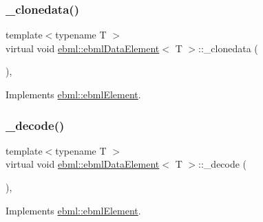 \subsubsection{\texorpdfstring{\+\_\+clonedata()}{\_clonedata()}}
{\footnotesize\ttfamily template$<$typename T $>$ \\
virtual void \mbox{\hyperlink{classebml_1_1ebmlDataElement}{ebml\+::ebml\+Data\+Element}}$<$ T $>$\+::\+\_\+clonedata (\begin{DoxyParamCaption}\item[{const \mbox{\hyperlink{classebml_1_1ebmlElement}{ebml\+Element}} $\ast$}]{ }\end{DoxyParamCaption})\hspace{0.3cm}{\ttfamily [protected]}, {\ttfamily [virtual]}}



Implements \mbox{\hyperlink{classebml_1_1ebmlElement_a3ebe3aa75b62971f385c01f27c807a02}{ebml\+::ebml\+Element}}.

\mbox{\label{classebml_1_1ebmlDataElement_a8a3c04faedabb3667e6750fd2d563c59}} 
\subsubsection{\texorpdfstring{\+\_\+decode()}{\_decode()}\hspace{0.1cm}{\footnotesize\ttfamily [1/2]}}
{\footnotesize\ttfamily template$<$typename T $>$ \\
virtual void \mbox{\hyperlink{classebml_1_1ebmlDataElement}{ebml\+::ebml\+Data\+Element}}$<$ T $>$\+::\+\_\+decode (\begin{DoxyParamCaption}\item[{const \mbox{\hyperlink{classebml_1_1parseString}{parse\+String}} \&}]{ }\end{DoxyParamCaption})\hspace{0.3cm}{\ttfamily [protected]}, {\ttfamily [virtual]}}



Implements \mbox{\hyperlink{classebml_1_1ebmlElement_af7852c01970bf937f6787eac4843bdbd}{ebml\+::ebml\+Element}}.

\mbox{\label{classebml_1_1ebmlDataElement_a54798682308de38d13ebf05ca4f6df7e}} 
